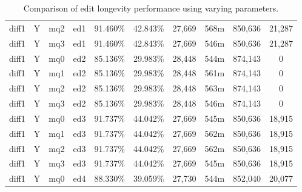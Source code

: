 \begin{sidewaystable}[!tp]
\begin{center}
\begin{tabular}{|c|c|c|c||c|c||c|c|c|c|}
diff1 & Y & mq2 & ed1 & 91.460\% & 42.843\% & 27,669 & 568m & 850,636 & 21,287 \\
diff1 & Y & mq3 & ed1 & 91.460\% & 42.843\% & 27,669 & 546m & 850,636 & 21,287 \\
diff1 & Y & mq0 & ed2 & 85.136\% & 29.983\% & 28,448 & 544m & 874,143 & 0 \\
diff1 & Y & mq1 & ed2 & 85.136\% & 29.983\% & 28,448 & 561m & 874,143 & 0 \\
diff1 & Y & mq2 & ed2 & 85.136\% & 29.983\% & 28,448 & 563m & 874,143 & 0 \\
diff1 & Y & mq3 & ed2 & 85.136\% & 29.983\% & 28,448 & 546m & 874,143 & 0 \\
diff1 & Y & mq0 & ed3 & 91.737\% & 44.042\% & 27,669 & 545m & 850,636 & 18,915 \\
diff1 & Y & mq1 & ed3 & 91.737\% & 44.042\% & 27,669 & 562m & 850,636 & 18,915 \\
diff1 & Y & mq2 & ed3 & 91.737\% & 44.042\% & 27,669 & 562m & 850,636 & 18,915 \\
diff1 & Y & mq3 & ed3 & 91.737\% & 44.042\% & 27,669 & 545m & 850,636 & 18,915 \\
diff1 & Y & mq0 & ed4 & 88.330\% & 39.059\% & 27,730 & 544m & 852,040 & 20,077 \\
\hline
\end{tabular}
\end{center}
\caption{Comparison of edit longevity performance using
    varying parameters.}
\end{sidewaystable}

